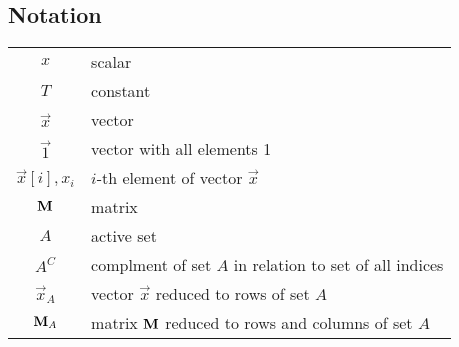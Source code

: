 \subsection*{Notation}
\begin{tabular}{c l}
$x$ & scalar\\
$T$ & constant\\
$\vec{x}$ & vector\\
$\vec{1}$ & vector with all elements 1\\
$\vec{x}[i],x_i$ & $i$-th element of vector $\vec{x}$\\
$\boldsymbol{\mathrm{M}}$ & matrix\\
$A$ & active set\\
$A^C$ & complment of set $A$ in relation to set of all indices\\ 
$\vec{x}_A$ & vector $\vec{x}$ reduced to rows of set $A$ \\
$\boldsymbol{\mathrm{M}}_A$ & matrix $\boldsymbol{\mathrm{M}}$ reduced to rows and columns of set $A$ \\
\end{tabular}



